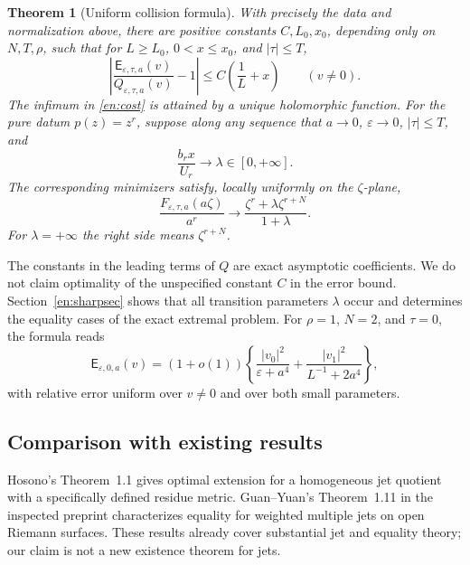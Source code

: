 \documentclass[12pt]{amsart}
\newtheorem{thm}{Theorem}[section]
\theoremstyle{definition}
\theoremstyle{remark}
\numberwithin{equation}{section}
\newcommand{\Cost}{\mathsf E}
\theoremstyle{definition}
\begin{document}
\begin{thm}[Uniform collision formula]\label{en:main}
With precisely the data and normalization above, there are positive
constants $C,L_0,x_0$, depending only on $N,T,\rho$, such that
for $L\ge L_0$, $0<x\le x_0$, and $|\tau|\le T$,
\begin{equation}\label{en:mainestimate}
 \left|\frac{\Cost_{\varepsilon,\tau,a}(v)}
 {Q_{\varepsilon,\tau,a}(v)}-1\right|
 \le C\left(\frac1L+x\right)\qquad(v\ne0).
\end{equation}
The infimum in \eqref{en:cost} is attained by a unique holomorphic
function. For the pure datum $p(z)=z^r$, suppose along any sequence that
$a\to0$, $\varepsilon\to0$, $|\tau|\le T$, and
\begin{equation}\label{en:lambda}
 \frac{b_rx}{U_r}\longrightarrow\lambda\in[0,+\infty].
\end{equation}
The corresponding minimizers satisfy, locally uniformly on the
$\zeta$-plane,
\begin{equation}\label{en:profile}
 \frac{F_{\varepsilon,\tau,a}(a\zeta)}{a^r}
 \longrightarrow
 \frac{\zeta^r+\lambda\zeta^{r+N}}{1+\lambda}.
\end{equation}
For $\lambda=+\infty$ the right side means $\zeta^{r+N}$.
\end{thm}

The constants in the leading terms of $Q$ are exact asymptotic
coefficients. We do not claim optimality of the unspecified constant
$C$ in the error bound. Section~\ref{en:sharpsec} shows that all transition
parameters $\lambda$ occur and determines the equality cases of the exact
extremal problem. For $\rho=1$, $N=2$, and $\tau=0$, the formula reads
\begin{equation}\label{en:twopointintro}
 \Cost_{\varepsilon,0,a}(v)
 =(1+o(1))\left\{
 \frac{|v_0|^2}{\varepsilon+a^4}
 +\frac{|v_1|^2}{L^{-1}+2a^4}\right\},
\end{equation}
with relative error uniform over $v\ne0$ and over both small parameters.

\subsection{Comparison with existing results}
Hosono's Theorem~1.1 \cite{Hos20} gives optimal extension for a
homogeneous jet quotient with a specifically defined residue metric.
Guan--Yuan's Theorem~1.11 in the inspected preprint \cite{GY25}
characterizes equality for weighted multiple jets on open Riemann
surfaces. These results already cover substantial jet and equality
theory; our claim is not a new existence theorem for jets.
\end{document}
